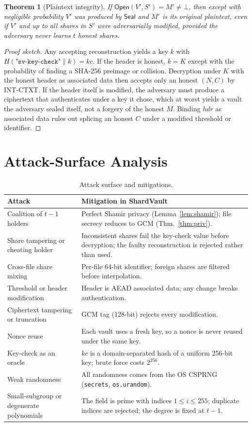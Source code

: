 \documentclass[11pt]{article}
\newtheorem{theorem}{Theorem}
\theoremstyle{definition}
\begin{document}
\begin{theorem}[Plaintext integrity]
If $\mathsf{Open}(V', S') = M' \ne \bot$, then except with negligible probability $V'$ was produced by $\mathsf{Seal}$ and $M'$ is its original plaintext, even if $V'$ and up to all shares in $S'$ were adversarially modified, provided the adversary never learns $t$ honest shares.
\end{theorem}
\begin{proof}[Proof sketch]
Any accepting reconstruction yields a key $k$ with $H(\texttt{"sv-key-check"}\|k) = \mathit{kc}$. If the header is honest, $k = K$ except with the probability of finding a SHA-256 preimage or collision. Decryption under $K$ with the honest header as associated data then accepts only an honest $(N, C)$ by INT-CTXT. If the header itself is modified, the adversary must produce a ciphertext that authenticates under a key it chose, which at worst yields a vault the adversary sealed itself, not a forgery of the honest $M$. Binding $\mathit{hdr}$ as associated data rules out splicing an honest $C$ under a modified threshold or identifier.
\end{proof}

\section{Attack-Surface Analysis}\label{sec:attack}
\begin{table}[h]
\centering\small
\begin{tabular}{p{4.2cm}p{9.8cm}}
\toprule
\textbf{Attack} & \textbf{Mitigation in ShardVault} \\
\midrule
Coalition of $t-1$ holders & Perfect Shamir privacy (Lemma~\ref{lem:shamir}); file secrecy reduces to GCM (Thm.~\ref{thm:priv}). \\
Share tampering or cheating holder & Inconsistent shares fail the key-check value before decryption; the faulty reconstruction is rejected rather than used. \\
Cross-file share mixing & Per-file 64-bit identifier; foreign shares are filtered before interpolation. \\
Threshold or header modification & Header is AEAD associated data; any change breaks authentication. \\
Ciphertext tampering or truncation & GCM tag (128-bit) rejects every modification. \\
Nonce reuse & Each vault uses a fresh key, so a nonce is never reused under the same key. \\
Key-check as an oracle & $\mathit{kc}$ is a domain-separated hash of a uniform 256-bit key; brute force costs $2^{256}$. \\
Weak randomness & All randomness comes from the OS CSPRNG (\texttt{secrets}, \texttt{os.urandom}). \\
Small-subgroup or degenerate polynomials & The field is prime with indices $1 \le i \le 255$; duplicate indices are rejected; the degree is fixed at $t-1$. \\
\bottomrule
\end{tabular}
\caption{Attack surface and mitigations.}
\end{table}
\end{document}
